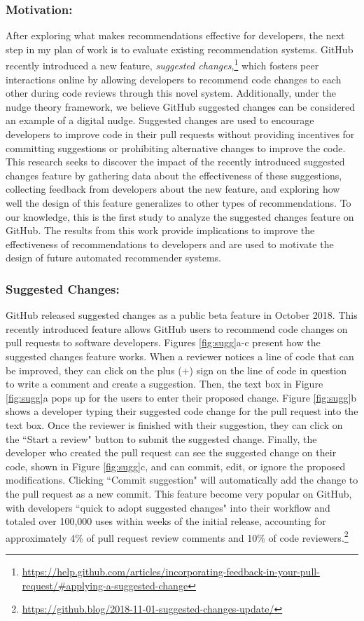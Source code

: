 \subsubsection{Motivation:} After exploring what makes recommendations effective for developers, the next step in my plan of work is to evaluate existing recommendation systems. GitHub recently introduced a new feature, \textit{suggested changes},\footnote{\url{https://help.github.com/articles/incorporating-feedback-in-your-pull-request/\#applying-a-suggested-change}} which fosters peer interactions online by allowing developers to recommend code changes to each other during code reviews through this novel system. Additionally, under the nudge theory framework, we believe GitHub suggested changes can be considered an example of a digital nudge. Suggested changes are used to encourage developers to improve code in their pull requests without providing incentives for committing suggestions or prohibiting alternative changes to improve the code. This research seeks to discover the impact of the recently introduced suggested changes feature by gathering data about the effectiveness of these suggestions, collecting feedback from developers about the new feature, and exploring how well the design of this feature generalizes to other types of recommendations. To our knowledge, this is the first study to analyze the suggested changes feature on GitHub. The results from this work provide implications to improve the effectiveness of recommendations to developers and are used to motivate the design of future automated recommender systems.

\subsubsection{Suggested Changes:} GitHub released suggested changes as a public beta feature in October 2018. This recently introduced feature allows GitHub users to recommend code changes on pull requests to software developers. Figures \ref{fig:sugg}a-c present how the suggested changes feature works. When a reviewer notices a line of code that can be improved, they can click on the plus (+) sign on the line of code in question to write a comment and create a suggestion. Then, the text box in Figure \ref{fig:sugg}a pops up for the users to enter their proposed change. Figure \ref{fig:sugg}b shows a developer typing their suggested code change for the pull request into the text box. Once the reviewer is finished with their suggestion, they can click on the ``Start a review" button to submit the suggested change. Finally, the developer who created the pull request can see the suggested change on their code, shown in Figure \ref{fig:sugg}c, and can commit, edit, or ignore the proposed modifications. Clicking ``Commit suggestion" will automatically add the change to the pull request as a new commit. This feature become very popular on GitHub, with developers ``quick to adopt suggested changes" into their workflow and totaled over 100,000 uses within weeks of the initial release, accounting for approximately 4\% of pull request review comments and 10\% of code  reviewers.\footnote{\label{SuggestBlog}\url{https://github.blog/2018-11-01-suggested-changes-update/}}

